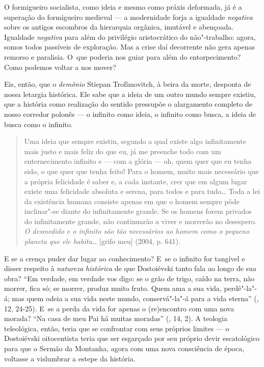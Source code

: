 O formigueiro socialista, como ideia e mesmo como práxis deformada, já é
a superação do formigueiro medieval --- a modernidade forja a igualdade
\emph{negativa} sobre os antigos escombros da hierarquia orgânica,
imutável e abençoada. Igualdade \emph{negativa} para além do privilégio
aristocrático do não"-trabalho: agora, somos todos passíveis de
exploração. Mas a crise daí decorrente não gera apenas remorso e
paralisia. O~que poderia nos guiar para além do entorpecimento? Como
podemos voltar a nos mover?

Eis, então, que o \emph{demônio} Stiepan Trofímovitch, à beira da morte,
desponta de nossa letargia histórica. Ele sabe que a ideia de um outro
mundo sempre existiu, que a história como realização do sentido
pressupõe o alargamento completo de nosso corredor polonês --- o infinito
como ideia, o infinito como busca, a ideia de busca como o infinito.

\begin{quote}
Uma ideia que sempre existiu, segundo a qual existe algo infinitamente
mais justo e mais feliz do que eu, já me preenche todo com um
enternecimento infinito e --- com a glória --- oh, quem quer que eu tenha
sido, o que quer que tenha feito! Para o homem, muito mais necessário
que a própria felicidade é saber e, a cada instante, crer que em algum
lugar existe uma felicidade absoluta e serena, para todos e para tudo\ldots
Toda a lei da existência humana consiste apenas em que o homem sempre
pôde inclinar"-se diante do infinitamente grande. Se os homens forem
privados do infinitamente grande, não continuarão a viver e morrerão no
desespero. \emph{O desmedido e o infinito são tão necessários ao homem
como o pequeno planeta que ele habita\ldots} {[}grifo meu{]} (2004, p.
641).
\end{quote}

E se a crença puder dar lugar ao conhecimento? E~se o infinito for
tangível e disser respeito à \emph{natureza histórica} de que
Dostoiévski tanto fala ao longo de sua obra? ``Em verdade, em verdade
vos digo: se o grão de trigo, caído na terra, não morrer, fica só; se
morrer, produz muito fruto. Quem ama a sua vida, perdê"-la"-á; mas quem
odeia a sua vida neste mundo, conservá"-la"-á para a vida eterna'' (,
12, 24-25). E~se a perda da vida for apenas o (re)encontro com uma nova
morada? ``Na casa de meu Pai há muitas moradas'' (, 14, 2). A
teologia teleológica, então, teria que se confrontar com seus próprios
limites --- o Dostoiévski oitocentista teria que ser esgarçado por seu
próprio devir escatológico para que o Sermão da Montanha, agora com uma
nova consciência de época, voltasse a vislumbrar a estepe da história.

